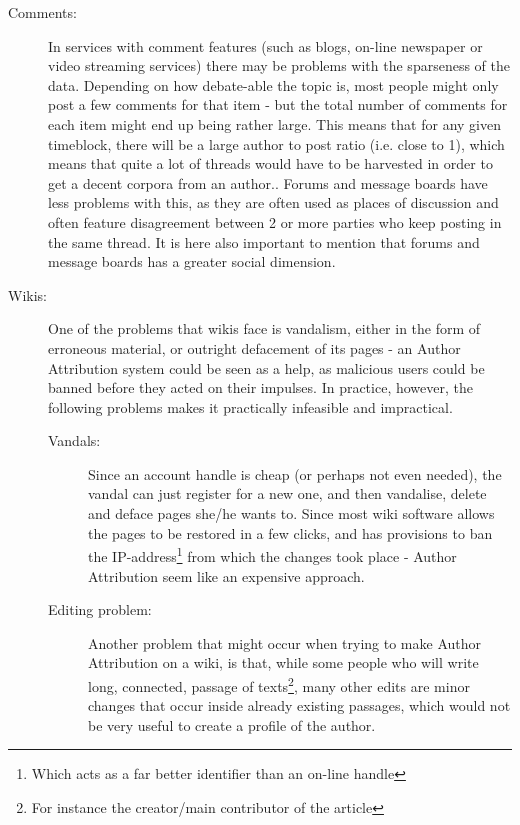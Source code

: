 \begin{description}
\item[Comments:] In services with comment features (such as blogs, on-line newspaper or video streaming services) there may be problems with the sparseness of the data. Depending on how debate-able the topic is, most people might only post a few comments for that item - but the total number of comments for each item might end up being rather large. This means that for any given timeblock, there will be a large author to post ratio (i.e. close to 1), which means that quite a lot of threads would have to be harvested in order to get a decent corpora from an author.. Forums and message boards have less problems with this, as they are often used as places of discussion and often feature disagreement between 2 or more parties who keep posting in the same thread. It is here also important to mention that forums and message boards has a greater social dimension.

\item[Wikis:] One of the problems that wikis face is vandalism, either in the form of erroneous material, or outright defacement of its pages - an Author Attribution system could be seen as a help, as malicious users could be banned before they acted on their impulses. In practice, however, the following problems makes it practically infeasible and impractical.
\begin{description}
\item[Vandals:] Since an account handle is cheap (or perhaps not even needed), the vandal can just register for a new one, and then vandalise, delete and deface pages she/he wants to. Since most wiki software allows the pages to be restored in a few clicks, and has provisions to ban the IP-address\footnote{Which acts as a far better identifier than an on-line handle} from which the changes took place - Author Attribution seem like an expensive approach.  

\item[Editing problem:] Another problem that might occur when trying to make Author Attribution on a wiki, is that, while some people who will write long, connected, passage of texts\footnote{For instance the creator/main contributor of the article}, many other edits are minor changes that occur inside already existing passages, which would not be very useful to create a profile of the author.   
\end{description} 
\end{description}

